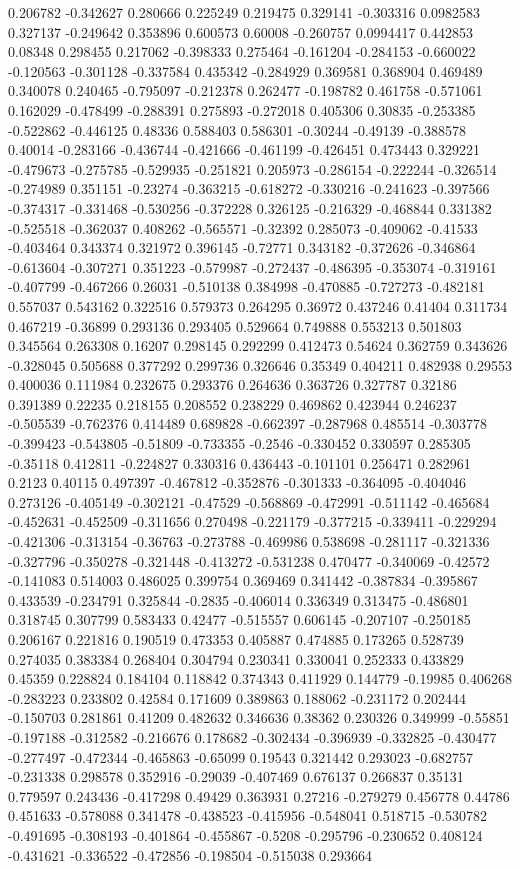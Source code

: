 0.206782 -0.342627 0.280666 0.225249 0.219475 0.329141 -0.303316 0.0982583 0.327137 -0.249642 0.353896 0.600573 0.60008 -0.260757 0.0994417 0.442853 0.08348 0.298455 0.217062 -0.398333 0.275464 -0.161204 -0.284153 -0.660022 -0.120563 -0.301128 -0.337584 0.435342 -0.284929 0.369581 0.368904 0.469489 0.340078 0.240465 -0.795097 -0.212378 0.262477 -0.198782 0.461758 -0.571061 0.162029 -0.478499 -0.288391 0.275893 -0.272018 0.405306 0.30835 -0.253385 -0.522862 -0.446125 0.48336 0.588403 0.586301 -0.30244 -0.49139 -0.388578 0.40014 -0.283166 -0.436744 -0.421666 -0.461199 -0.426451 0.473443 0.329221 -0.479673 -0.275785 -0.529935 -0.251821 0.205973 -0.286154 -0.222244 -0.326514 -0.274989 0.351151 -0.23274 -0.363215 -0.618272 -0.330216 -0.241623 -0.397566 -0.374317 -0.331468 -0.530256 -0.372228 0.326125 -0.216329 -0.468844 0.331382 -0.525518 -0.362037 0.408262 -0.565571 -0.32392 0.285073 -0.409062 -0.41533 -0.403464 0.343374 0.321972 0.396145 -0.72771 0.343182 -0.372626 -0.346864 -0.613604 -0.307271 0.351223 -0.579987 -0.272437 -0.486395 -0.353074 -0.319161 -0.407799 -0.467266 0.26031 -0.510138 0.384998 -0.470885 -0.727273 -0.482181 0.557037 0.543162 0.322516 0.579373 0.264295 0.36972 0.437246 0.41404 0.311734 0.467219 -0.36899 0.293136 0.293405 0.529664 0.749888 0.553213 0.501803 0.345564 0.263308 0.16207 0.298145 0.292299 0.412473 0.54624 0.362759 0.343626 -0.328045 0.505688 0.377292 0.299736 0.326646 0.35349 0.404211 0.482938 0.29553 0.400036 0.111984 0.232675 0.293376 0.264636 0.363726 0.327787 0.32186 0.391389 0.22235 0.218155 0.208552 0.238229 0.469862 0.423944 0.246237 -0.505539 -0.762376 0.414489 0.689828 -0.662397 -0.287968 0.485514 -0.303778 -0.399423 -0.543805 -0.51809 -0.733355 -0.2546 -0.330452 0.330597 0.285305 -0.35118 0.412811 -0.224827 0.330316 0.436443 -0.101101 0.256471 0.282961 0.2123 0.40115 0.497397 -0.467812 -0.352876 -0.301333 -0.364095 -0.404046 0.273126 -0.405149 -0.302121 -0.47529 -0.568869 -0.472991 -0.511142 -0.465684 -0.452631 -0.452509 -0.311656 0.270498 -0.221179 -0.377215 -0.339411 -0.229294 -0.421306 -0.313154 -0.36763 -0.273788 -0.469986 0.538698 -0.281117 -0.321336 -0.327796 -0.350278 -0.321448 -0.413272 -0.531238 0.470477 -0.340069 -0.42572 -0.141083 0.514003 0.486025 0.399754 0.369469 0.341442 -0.387834 -0.395867 0.433539 -0.234791 0.325844 -0.2835 -0.406014 0.336349 0.313475 -0.486801 0.318745 0.307799 0.583433 0.42477 -0.515557 0.606145 -0.207107 -0.250185 0.206167 0.221816 0.190519 0.473353 0.405887 0.474885 0.173265 0.528739 0.274035 0.383384 0.268404 0.304794 0.230341 0.330041 0.252333 0.433829 0.45359 0.228824 0.184104 0.118842 0.374343 0.411929 0.144779 -0.19985 0.406268 -0.283223 0.233802 0.42584 0.171609 0.389863 0.188062 -0.231172 0.202444 -0.150703 0.281861 0.41209 0.482632 0.346636 0.38362 0.230326 0.349999 -0.55851 -0.197188 -0.312582 -0.216676 0.178682 -0.302434 -0.396939 -0.332825 -0.430477 -0.277497 -0.472344 -0.465863 -0.65099 0.19543 0.321442 0.293023 -0.682757 -0.231338 0.298578 0.352916 -0.29039 -0.407469 0.676137 0.266837 0.35131 0.779597 0.243436 -0.417298 0.49429 0.363931 0.27216 -0.279279 0.456778 0.44786 0.451633 -0.578088 0.341478 -0.438523 -0.415956 -0.548041 0.518715 -0.530782 -0.491695 -0.308193 -0.401864 -0.455867 -0.5208 -0.295796 -0.230652 0.408124 -0.431621 -0.336522 -0.472856 -0.198504 -0.515038 0.293664 